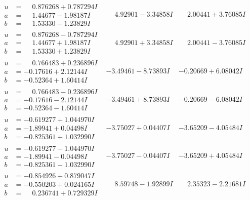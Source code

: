 \documentclass[1p]{elsarticle_modified}
\theoremstyle{definition}
\begin{document}
$$\begin{array}{c|c|c}
\begin{aligned}
u &= \phantom{-}0.876268 + 0.787294 I \\
a &= \phantom{-}1.44677 - 1.98187 I \\
b &= \phantom{-}1.53330 - 1.23829 I\end{aligned}
 & \phantom{-}4.92901 - 3.34858 I & \phantom{-}2.00441 + 3.76085 I \\ \hline\begin{aligned}
u &= \phantom{-}0.876268 - 0.787294 I \\
a &= \phantom{-}1.44677 + 1.98187 I \\
b &= \phantom{-}1.53330 + 1.23829 I\end{aligned}
 & \phantom{-}4.92901 + 3.34858 I & \phantom{-}2.00441 - 3.76085 I \\ \hline\begin{aligned}
u &= \phantom{-}0.766483 + 0.236896 I \\
a &= -0.17616 + 2.12144 I \\
b &= -0.52364 + 1.60414 I\end{aligned}
 & -3.49461 - 8.73893 I & -0.20669 + 6.08042 I \\ \hline\begin{aligned}
u &= \phantom{-}0.766483 - 0.236896 I \\
a &= -0.17616 - 2.12144 I \\
b &= -0.52364 - 1.60414 I\end{aligned}
 & -3.49461 + 8.73893 I & -0.20669 - 6.08042 I \\ \hline\begin{aligned}
u &= -0.619277 + 1.044970 I \\
a &= -1.89941 + 0.04498 I \\
b &= -0.825361 + 1.032990 I\end{aligned}
 & -3.75027 + 0.04407 I & -3.65209 - 4.05484 I \\ \hline\begin{aligned}
u &= -0.619277 - 1.044970 I \\
a &= -1.89941 - 0.04498 I \\
b &= -0.825361 - 1.032990 I\end{aligned}
 & -3.75027 - 0.04407 I & -3.65209 + 4.05484 I \\ \hline\begin{aligned}
u &= -0.854926 + 0.879047 I \\
a &= -0.550203 + 0.024165 I \\
b &= \phantom{-}0.236741 + 0.729329 I\end{aligned}
 & \phantom{-}8.59748 - 1.92899 I & \phantom{-}2.35323 - 2.21681 I \\ \hline\begin{aligned}

\end{aligned}
\end{array}$$
\end{document}
